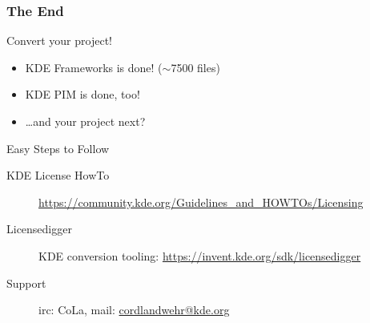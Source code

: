 \documentclass[t,compress,aspectratio=169]{beamer}
\begin{document}
\begin{frame}
    \frametitle{The End}
    \vspace{0.3cm}
    \begin{block}{}
        \centering\begin{Huge}Convert your project!\end{Huge}
    \end{block}
    \medskip

    \begin{itemize}
        \item KDE Frameworks is done! ($\sim$7500 files)
        \item KDE PIM is done, too!
        \item \dots and your project next?
    \end{itemize}

    \vspace{0.5cm}
    \begin{tiny}
        \begin{block}{Easy Steps to Follow}
            \begin{description}
                \item [KDE License HowTo] \url{https://community.kde.org/Guidelines_and_HOWTOs/Licensing}
                \item [Licensedigger] KDE conversion tooling: \url{https://invent.kde.org/sdk/licensedigger}
                \item [Support] irc: CoLa, mail: \url{cordlandwehr@kde.org}
            \end{description}
        \end{block}
    \end{tiny}
\end{frame}
\end{document}
